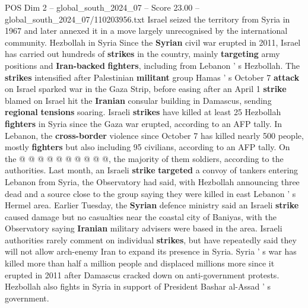 \begin{textsample}{POS Dim 2 – global\_south\_2024\_07 – Score 23.00 – global\_south\_2024\_07/110203956.txt}
Israel seized the territory from Syria in 1967 and later annexed it in a move largely unrecognised by the international community.
Hezbollah in Syria Since the \textbf{Syrian} civil war erupted in 2011, Israel has carried out hundreds of \textbf{strikes} in the country, mainly \textbf{targeting} army positions and \textbf{Iran-backed} \textbf{fighters}, including from Lebanon ' s Hezbollah.
The \textbf{strikes} intensified after Palestinian \textbf{militant} group Hamas ' s October 7 \textbf{attack} on Israel sparked war in the Gaza Strip, before easing after an April 1 \textbf{strike} blamed on Israel hit the \textbf{Iranian} consular building in Damascus, sending \textbf{regional} \textbf{tensions} soaring.
Israeli \textbf{strikes} have killed at least 25 Hezbollah \textbf{fighters} in Syria since the Gaza war erupted, according to an AFP tally.
In Lebanon, the \textbf{cross-border} violence since October 7 has killed nearly 500 people, mostly \textbf{fighters} but also including 95 civilians, according to an AFP tally.
On the @ @ @ @ @ @ @ @ @ @, the majority of them soldiers, according to the authorities.
Last month, an Israeli \textbf{strike} \textbf{targeted} a convoy of tankers entering Lebanon from Syria, the Observatory had said, with Hezbollah announcing three dead and a source close to the group saying they were killed in east Lebanon ' s Hermel area.
Earlier Tuesday, the \textbf{Syrian} defence ministry said an Israeli \textbf{strike} caused damage but no casualties near the coastal city of Baniyas, with the Observatory saying \textbf{Iranian} military advisers were based in the area.
Israeli authorities rarely comment on individual \textbf{strikes}, but have repeatedly said they will not allow arch-enemy Iran to expand its presence in Syria.
Syria ' s war has killed more than half a million people and displaced millions more since it erupted in 2011 after Damascus cracked down on anti-government protests.
Hezbollah also fights in Syria in support of President Bashar al-Assad ' s government.

\end{textsample}
